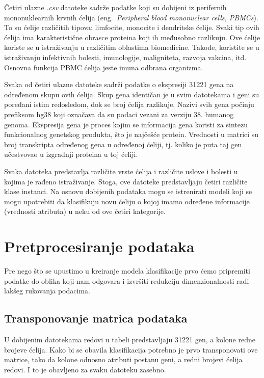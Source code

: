 \documentclass[a4paper]{article}
\begin{document}
Četiri ulazne \emph{.csv} datoteke sadrže podatke koji su dobijeni iz perifernih mononuklearnih krvnih ćelija (eng.~{\em Peripheral blood mononuclear cells, PBMCs}). To su ćelije različitih tipova: limfocite, monocite i dendritske ćelije. Svaki tip ovih ćelija ima karakteristične obrasce proteina koji ih međusobno razlikuju. Ove ćelije koriste se u istraživanju u različitim oblastima biomedicine. Takođe, koristite se u istraživanju infektivnih bolesti, imunologije, maligniteta, razvoja vakcina, itd. Osnovna funkcija PBMC ćelija jeste imuna odbrana organizma.

Svaka od četiri ulazne datoteke sadrži podatke o ekspresiji 31221 gena na određenom skupu ovih ćelija. Skup gena identičan je u svim datotekama i geni su poređani istim redosledom, dok se broj ćelija razlikuje. Nazivi svih gena počinju prefiksom hg38 koji označava da su podaci vezani za verziju 38. humanog genoma. Ekspresija gena je proces kojim se informacija gena koristi za sintezu funkcionalnog genetskog produkta, što je najčešće protein. Vrednosti u matrici su broj transkripta određenog gena u određenoj ćeliji, tj. koliko je puta taj gen učestvovao u izgradnji proteina u toj ćeliji.

Svaka datoteka predstavlja različite vrste ćelija i različite uslove i bolesti u kojima je rađeno istraživanje. Stoga, ove datoteke predstavljaju četiri različite klase instanci. Na osnovu dobijenih podataka mogu se istrenirati modeli koji se mogu upotrebiti da klasifikuju novu ćeliju o kojoj imamo određene informacije (vrednosti atributa) u neku od ove četiri kategorije.  

\section{Pretprocesiranje podataka}
\label{sec:pretprocesiranje}

Pre nego što se upustimo u kreiranje modela klasifikacije prvo ćemo pripremiti podatke do oblika koji nam odgovara i izvršiti redukciju dimenzionalnosti radi lakšeg rukovanja podacima.

\subsection{Transponovanje matrica podataka}
U dobijenim datotekama redovi u tabeli predstavljaju 31221 gen, a kolone redne brojeve ćelija. Kako bi se obavila klasifikacija potrebno je prvo transponovati ove matrice, tako da kolone odnosno atributi postanu geni, a redni brojevi ćelija redovi. I to je obavljeno za svaku datoteku zasebno.
\end{document}
